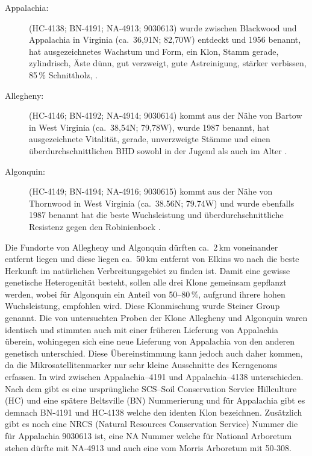 \documentclass[twocolumn]{scrartcl}
\begin{document}
\begin{description}
  \item[Appalachia:] (HC-4138; BN-4191; NA-4913; 9030613) wurde zwischen
Blackwood und Appalachia in Virginia (ca.~36,91N; 82,70W) entdeckt und 1956
benannt, hat ausgezeichnetes Wachstum und Form, ein Klon, Stamm gerade,
zylindrisch, Äste dünn, gut verzweigt, gute Astreinigung, stärker verbissen,
85\,\% Schnittholz, \citep{steinergroup1987robinie,zsombor1980robinie,kapusi1995robinie}.
  \item[Allegheny:]  (HC-4146; BN-4192; NA-4914; 9030614) kommt aus der Nähe von
Bartow in West Virginia (ca.~38,54N; 79,78W), wurde 1987 benannt, hat
ausgezeichnete Vitalität, gerade, unverzweigte Stämme und einen
überdurchschnittlichen BHD sowohl in der Jugend als auch im Alter \citep{steinergroup1987robinie}.
  \item[Algonquin:] (HC-4149; BN-4194; NA-4916; 9030615) kommt aus der Nähe von
Thornwood in West Virginia (ca.~38.56N; 79.74W) und wurde ebenfalls 1987 benannt
hat die beste Wuchsleistung und überdurchschnittliche Resistenz gegen den
Robinienbock \citep{steinergroup1987robinie}.
\end{description}

Die Fundorte von Allegheny und Algonquin dürften ca.\ 2\,km
voneinander entfernt liegen und diese liegen ca.\ 50\,km entfernt von Elkins wo
nach \cite{hopp1941robinie} die beste Herkunft im natürlichen Verbreitungsgebiet
zu finden ist.  Damit eine gewisse genetische Heterogenität besteht, sollen alle
drei Klone gemeinsam gepflanzt werden, wobei für Algonquin ein Anteil von
50--80\,\%, aufgrund ihrere hohen Wuchsleistung, empfohlen wird. Diese
Klonmischung wurde Steiner Group genannt. Die von \cite{liesebach2012robinie}
untersuchten Proben der Klone Allegheny und Algonquin waren identisch und
stimmten auch mit einer früheren Lieferung von Appalachia überein, wohingegen
sich eine neue Lieferung von Appalachia von den anderen genetisch unterschied.
Diese Übereinstimmung kann jedoch auch daher kommen, da die
Mikrosatellitenmarker nur sehr kleine Ausschnitte des Kerngenoms erfassen. In
\cite{liesebach2021robinie} wird zwischen Appalachia--4191 und Appalachia--4138
unterschieden. Nach dem \cite{steinergroup1987robinie} gibt es eine
ursprüngliche SCS--Soil Conservation Service Hillculture (HC) und eine spätere
Beltsville (BN) Nummerierung und für Appalachia gibt es demnach BN-4191 und
HC-4138 welche den identen Klon bezeichnen. Zusätzlich gibt es noch eine NRCS
(Natural Resources Conservation Service) Nummer die für Appalachia 9030613 ist,
eine NA Nummer welche für National Arboretum stehen dürfte mit NA-4913 und auch
eine vom Morris Arboretum mit 50-308.
\end{document}
